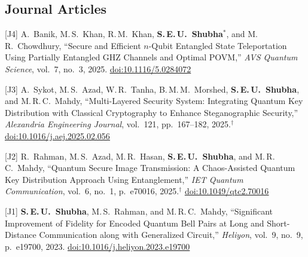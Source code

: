 \documentclass[letterpaper,11pt]{article}
\newcommand{\me}{\textbf{S.\,E.\,U.~Shubha}}
\newcommand{\cvlink}[2]{\href{#1}{\underline{#2}}}
\begin{document}
\subsection{Journal Articles}
\begin{pubs}[label={[J\arabic*]}]
  \item[{[J4]}] A.~Banik, M.\,S.~Khan, R.\,M.~Khan, \me$^{*}$, and M.\,R.~Chowdhury, ``Secure and Efficient $n$-Qubit Entangled State Teleportation Using Partially Entangled GHZ Channels and Optimal POVM,'' \textit{AVS Quantum Science}, vol.~7, no.~3, 2025. \cvlink{https://doi.org/10.1116/5.0284072}{doi:10.1116/5.0284072}
  \item[{[J3]}] A.~Sykot, M.\,S.~Azad, W.\,R.~Tanha, B.\,M.\,M.~Morshed, \me, and M.\,R.\,C.~Mahdy, ``Multi-Layered Security System: Integrating Quantum Key Distribution with Classical Cryptography to Enhance Steganographic Security,'' \textit{Alexandria Engineering Journal}, vol.~121, pp.~167--182, 2025.$^{\dagger}$ \cvlink{https://doi.org/10.1016/j.aej.2025.02.056}{doi:10.1016/j.aej.2025.02.056}
  \item[{[J2]}] R.~Rahman, M.\,S.~Azad, M.\,R.~Hasan, \me, and M.\,R.\,C.~Mahdy, ``Quantum Secure Image Transmission: A Chaos-Assisted Quantum Key Distribution Approach Using Entanglement,'' \textit{IET Quantum Communication}, vol.~6, no.~1, p.~e70016, 2025.$^{\dagger}$ \cvlink{https://doi.org/10.1049/qtc2.70016}{doi:10.1049/qtc2.70016}
  \item[{[J1]}] \me, M.\,S.~Rahman, and M.\,R.\,C.~Mahdy, ``Significant Improvement of Fidelity for Encoded Quantum Bell Pairs at Long and Short-Distance Communication along with Generalized Circuit,'' \textit{Heliyon}, vol.~9, no.~9, p.~e19700, 2023. \cvlink{https://doi.org/10.1016/j.heliyon.2023.e19700}{doi:10.1016/j.heliyon.2023.e19700}
\end{pubs}
\end{document}
